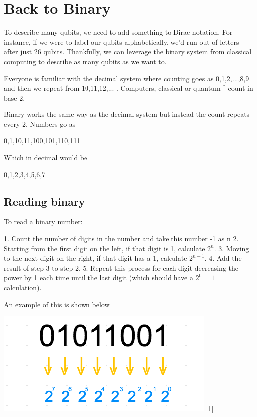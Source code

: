 \documentclass{book}
\begin{document}
\section{Back to Binary }


To describe many qubits, we need to add something to Dirac notation. For instance, if we were to label our qubits alphabetically, we'd run out of letters after just 26 qubits. Thankfully, we can leverage the binary system from classical computing to describe as many qubits as we want to. 


Everyone is familiar with the decimal system where counting goes as 0,1,2,...,8,9 and then we repeat from 10,11,12,... . Computers, classical or quantum $^*$ count in base 2. 

Binary works the same way as the decimal system but instead the count repeats every 2. Numbers go as    

0,1,10,11,100,101,110,111 \newline

Which in decimal would be 

0,1,2,3,4,5,6,7 

\subsection{ Reading binary }

To read a binary number:  
  
  
1. Count the number of digits in the number and take this number -1 as n
2. Starting from the first digit on the left, if that digit is 1, calculate $2^n$. 
3. Moving to the next digit on the right, if that digit has a 1, calculate $2^{n-1}$. 
4. Add the result of step 3 to step 2. 
5. Repeat this process for each digit decreasing the power by 1 each time until the last digit (which should have a $2^0 = 1$ calculation). 

An example of this is shown below


\includegraphics[scale=0.5]{Chapters/Images/binary_conversion.png}
[1]
\end{document}
